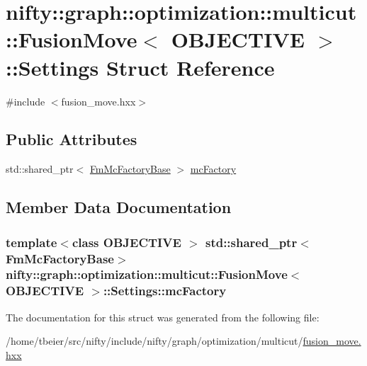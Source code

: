 \hypertarget{structnifty_1_1graph_1_1optimization_1_1multicut_1_1FusionMove_1_1Settings}{}\section{nifty\+:\+:graph\+:\+:optimization\+:\+:multicut\+:\+:Fusion\+Move$<$ O\+B\+J\+E\+C\+T\+I\+V\+E $>$\+:\+:Settings Struct Reference}
\label{structnifty_1_1graph_1_1optimization_1_1multicut_1_1FusionMove_1_1Settings}


{\ttfamily \#include $<$fusion\+\_\+move.\+hxx$>$}

\subsection*{Public Attributes}
\begin{DoxyCompactItemize}
\item 
std\+::shared\+\_\+ptr$<$ \hyperlink{classnifty_1_1graph_1_1optimization_1_1multicut_1_1FusionMove_ac5bc1ed4e26e01e441dd11cc3209d1d9}{Fm\+Mc\+Factory\+Base} $>$ \hyperlink{structnifty_1_1graph_1_1optimization_1_1multicut_1_1FusionMove_1_1Settings_ae7f5f644dbdf9acb5b1cfcd31f6be488}{mc\+Factory}
\end{DoxyCompactItemize}


\subsection{Member Data Documentation}
\hypertarget{structnifty_1_1graph_1_1optimization_1_1multicut_1_1FusionMove_1_1Settings_ae7f5f644dbdf9acb5b1cfcd31f6be488}{}
\subsubsection[{mc\+Factory}]{\setlength{\rightskip}{0pt plus 5cm}template$<$class O\+B\+J\+E\+C\+T\+I\+V\+E $>$ std\+::shared\+\_\+ptr$<${\bf Fm\+Mc\+Factory\+Base}$>$ {\bf nifty\+::graph\+::optimization\+::multicut\+::\+Fusion\+Move}$<$ O\+B\+J\+E\+C\+T\+I\+V\+E $>$\+::Settings\+::mc\+Factory}\label{structnifty_1_1graph_1_1optimization_1_1multicut_1_1FusionMove_1_1Settings_ae7f5f644dbdf9acb5b1cfcd31f6be488}


The documentation for this struct was generated from the following file\+:\begin{DoxyCompactItemize}
\item 
/home/tbeier/src/nifty/include/nifty/graph/optimization/multicut/\hyperlink{multicut_2fusion__move_8hxx}{fusion\+\_\+move.\+hxx}\end{DoxyCompactItemize}
